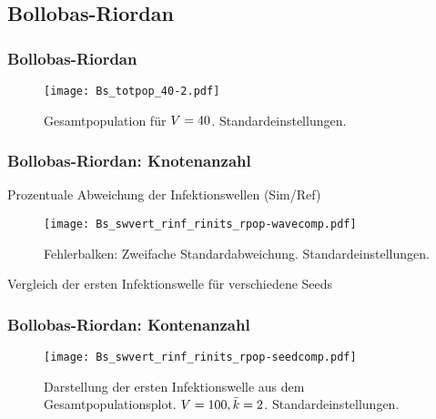 \subsection{Bollobas-Riordan}
\begin{frame}[t]
    \frametitle{Bollobas-Riordan}
    \begin{figure}[htpb]
        \centering
        \texttt{[image: Bs\_totpop\_40-2.pdf]}
        \caption{Gesamtpopulation für $V = 40$. Standardeinstellungen.}%
        \label{fig:Bs_totpop_40-2}
    \end{figure}
\end{frame}

\begin{frame}[t]
    \frametitle{Bollobas-Riordan: Knotenanzahl}
    Prozentuale Abweichung der Infektionswellen (Sim/Ref)
    \begin{figure}[htpb]
        \centering
            \texttt{[image: Bs\_swvert\_rinf\_rinits\_rpop-wavecomp.pdf]} \caption{Fehlerbalken: Zweifache Standardabweichung. Standardeinstellungen.}%
            \label{fig:Bs_swvert_finf_rinit_rpop-wavecomp}
    \end{figure}
\end{frame}

\begin{frame}[t]
    Vergleich der ersten Infektionswelle für verschiedene Seeds
    \frametitle{Bollobas-Riordan: Kontenanzahl}
    \begin{figure}[htpb]
        \centering
        \texttt{[image: Bs\_swvert\_rinf\_rinits\_rpop-seedcomp.pdf]}
        \caption{Darstellung der ersten Infektionswelle aus dem Gesamtpopulationsplot. $V = 100, \bar{k}=2$.
        Standardeinstellungen.}%
        \label{fig:Bs_swvert_rinf_rinits_rpop-seedcomp}
    \end{figure}
\end{frame}

